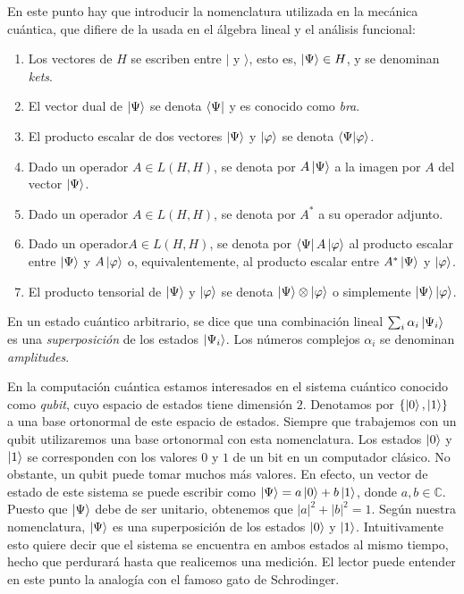 \documentclass{article}
\begin{document}
En este punto hay que introducir la nomenclatura utilizada en la mecánica cuántica, que difiere de la usada en el álgebra lineal y el análisis funcional: 
\begin{enumerate}
    \item Los vectores de $H$ se escriben entre $\lvert$ y $\rangle$, esto es, $\ket{\Psi} \in H$, y se denominan \emph{kets}. 
    \item El vector dual de $\ket{\Psi}$ se denota $\bra{\Psi}$ y es conocido como \emph{bra}. 
    \item El producto escalar de dos vectores $\ket{\Psi}$ y $\ket{\varphi}$ se denota $\bra{\Psi}\ket{\varphi}$. 
    \item Dado un operador $A \in L(H,H)$, se denota por $A \ket{\Psi}$ a la imagen por $A$ del vector $\ket{\Psi}$. 
    \item Dado un operador $A \in L(H,H)$, se denota por $A^*$ a su operador adjunto. 
    \item Dado un operador$A \in L(H,H)$, se denota por $\bra{\Psi}A\ket{\varphi}$ al producto escalar entre $\ket{\Psi}$ y $A\ket{\varphi}$ o, equivalentemente, al producto escalar entre $A^*\ket{\Psi}$ y $\ket{\varphi}$.
    \item El producto tensorial de $\ket{\Psi}$ y $\ket{\varphi}$ se denota $\ket{\Psi} \otimes \ket{\varphi}$ o simplemente $\ket{\Psi} \ket{\varphi}$.
\end{enumerate}

En un estado cuántico arbitrario, se dice que una combinación lineal $\sum_{i} \alpha_i \ket{\Psi_i}$ es una \emph{superposición} de los estados $\ket{\Psi_i}$. Los números complejos $\alpha_i$ se denominan \emph{amplitudes}.

En la computación cuántica estamos interesados en el sistema cuántico conocido como \emph{qubit}, cuyo espacio de estados tiene dimensión $2$. Denotamos por $\{\ket{0}, \ket{1}\}$ a una base ortonormal de este espacio de estados. Siempre que trabajemos con un qubit utilizaremos una base ortonormal con esta nomenclatura. Los estados $\ket{0}$ y $\ket{1}$ se corresponden con los valores $0$ y $1$ de un bit en un computador clásico. No obstante, un qubit puede tomar muchos más valores. En efecto, un vector de estado de este sistema se puede escribir como $\ket{\Psi} = a \ket{0} + b \ket{1}$, donde $a,b \in \mathbb{C}$. Puesto que $\ket{\Psi}$ debe de ser unitario, obtenemos que $|a|^2 + |b|^2 = 1$. Según nuestra nomenclatura, $\ket{\Psi}$ es una superposición de los estados $\ket{0}$ y $\ket{1}$. Intuitivamente esto quiere decir que el sistema se encuentra en ambos estados al mismo tiempo, hecho que perdurará hasta que realicemos una medición. El lector puede entender en este punto la analogía con el famoso gato de Schrodinger.
\end{document}
